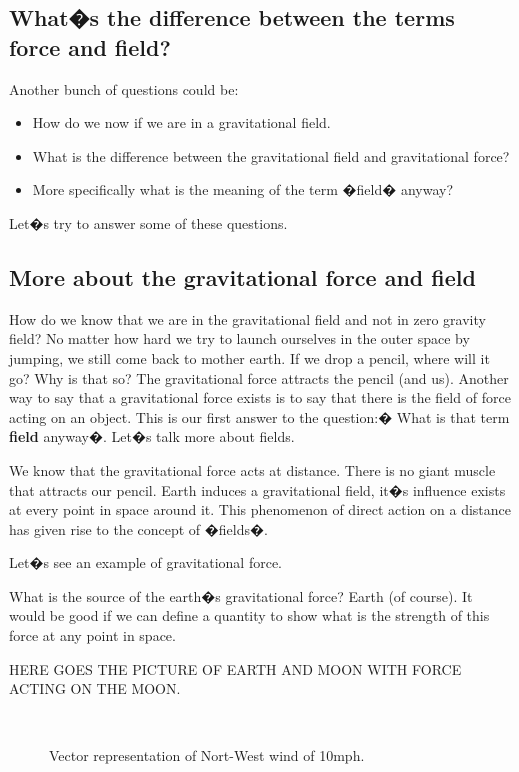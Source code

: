 \subsection{What�s the difference between the terms force and field?}

Another bunch of questions could be:
\begin{itemize}
\item How do we now if we are in a gravitational field.
\item What is the difference between the gravitational field and gravitational force?
\item More specifically what is the meaning of the term �field� anyway?
\end{itemize}

Let�s try to answer some of these questions.

\subsection{More about the gravitational force and field}

How do we know that we are in the gravitational field and not in zero gravity field? No matter how hard we try to launch ourselves in the outer space by jumping, we still come back to mother earth. If we drop a pencil, where will it go? Why is that so? The gravitational force attracts the pencil (and us).  Another way to say that a gravitational force exists is to say that there is the field of force acting on an object. This is our first answer to the question:� What is that term {\bf field} anyway�. Let�s talk more about fields.

We know that the gravitational force acts at distance. There is no giant muscle that attracts our pencil. Earth induces a gravitational field, it�s influence exists at every point in space around it. This phenomenon of direct action on a distance has given rise to the concept of �fields�.  

Let�s see an example of gravitational force. 

What is the source of the earth�s gravitational force? Earth (of course). It would be good if we can define a quantity to show what is the strength of this force at any point in space. 

HERE GOES THE PICTURE OF EARTH AND MOON WITH FORCE ACTING ON THE MOON. 


\begin{figure}[htbp]
\begin{center}
\strut{} \\
\end{center}
\caption{Vector representation of Nort-West wind of 10mph.}
\label{wind}
\end{figure}





